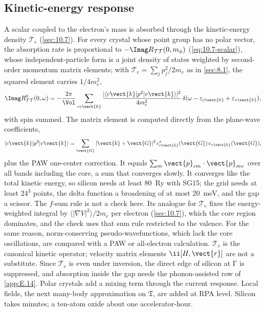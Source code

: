\subsection{Kinetic-energy response}

A scalar coupled to the electron's mass is absorbed through the kinetic-energy density $\mathcal{T}_e$ (\cref{sec:10.7}). For every crystal whose point group has no polar vector, the absorption rate is proportional to $-\Imag R_{\mathcal{T}\mathcal{T}}(0,m_\phi)$ (\cref{eq:10.7-scalar}), whose independent-particle form is a joint density of states weighted by second-order momentum matrix elements; with $\mathcal{T}_e = \sum_jp_j^2/2m_e$ as in \cref{sec:8.1}, the squared element carries $1/4m_e^2$,
\begin{equation}
  \Imag R^0_{\mathcal{T}\mathcal{T}}(0,\omega) = -\frac{2\pi}{\Vol}\sum_{cv\vect{k}}\frac{|\langle c\vect{k}|p^2|v\vect{k}\rangle|^2}{4m_e^2}\,\delta(\omega - \varepsilon_{c\vect{k}} + \varepsilon_{v\vect{k}}) ,
  \label{eq:E.16-TT}
\end{equation}
with spin summed. The matrix element is computed directly from the plane-wave coefficients,
\begin{equation*}
  \langle c\vect{k}|p^2|v\vect{k}\rangle = \sum_{\vect{G}}|\vect{k}+\vect{G}|^2\,c^*_{c\vect{k}}(\vect{G})\,c_{v\vect{k}}(\vect{G}) ,
\end{equation*}
plus the PAW one-center correction. It equals $\sum_m\vect{p}_{cm}\cdot\vect{p}_{mv}$ over all bands including the core, a sum that converges slowly. It converges like the total kinetic energy, so silicon needs at least \SI{80}{Ry} with SG15; the grid needs at least $24^3$ points, the delta function a broadening of at most \SI{20}{meV}, and the gap a scissor. The $f$-sum rule is not a check here. Its analogue for $\mathcal{T}_e$ fixes the energy-weighted integral by $\langle|\nabla V|^2\rangle/2m_e$ per electron (\cref{sec:10.7}), which the core region dominates, and the check uses that sum rule restricted to the valence. For the same reason, norm-conserving pseudo-wavefunctions, which lack the core oscillations, are compared with a PAW or all-electron calculation. $\mathcal{T}_e$ is the canonical kinetic operator; velocity matrix elements $\ii[H,\vect{r}]$ are not a substitute. Since $\mathcal{T}_e$ is even under inversion, the direct edge of silicon at $\mathrm{\Gamma}$ is suppressed, and absorption inside the gap needs the phonon-assisted row of \cref{app:E.14}. Polar crystals add a mixing term through the current response. Local fields, the next many-body approximation on $\mathfrak{T}$, are added at RPA level. Silicon takes minutes; a ten-atom oxide about one accelerator-hour.

